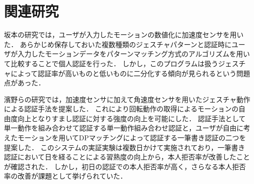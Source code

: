 \chapter{関連研究}

坂本の研究\cite{2-sakamoto}では，ユーザが入力したモーションの数値化に加速度センサを用いた．
あらかじめ保存しておいた複数種類のジェスチャパターンと認証時にユーザが入力したモーションデータをパターンマッチング方式のアルゴリズムを用いて比較することで個人認証を行った．
しかし，このプログラムは扱うジェスチャによって認証率が高いものと低いものに二分化する傾向が見られるという問題点があった．

濱野らの研究\cite{2-hamano}では，加速度センサに加えて角速度センサを用いたジェスチャ動作による認証手法を提案した．
これにより回転動作の取得によるモーションの自由度向上となりすまし認証に対する強度の向上を可能にした．
認証手法として単一動作を組み合わせて認証する単一動作組み合わせ認証と，ユーザが自由に考えたモーションを用いてDPマッチングによって認証する一筆書き認証の二つを提案した．
このシステムの実証実験は複数日かけて実施されており，一筆書き認証において日を経ることによる習熟度の向上から，本人拒否率が改善したことが確認された．
しかし，初日の認証での本人拒否率が高く，さらなる本人拒否率の改善が課題として挙げられていた．
